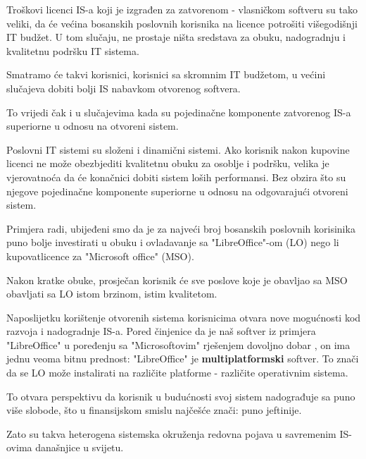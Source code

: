 \documentclass[times, utf8, seminar]{fit}
\begin{document}
Troškovi licenci IS-a koji je izgrađen za zatvorenom - vlasničkom softveru  su tako veliki, da će većina bosanskih poslovnih korisnika na licence potrošiti višegodišnji IT budžet. U tom slučaju, ne prostaje ništa sredstava za obuku, nadogradnju i kvalitetnu podršku IT sistema.

Smatramo će takvi korisnici, korisnici sa skromnim IT budžetom, u većini slučajeva dobiti bolji IS nabavkom otvorenog softvera.

To vrijedi čak i u slučajevima kada su pojedinačne komponente zatvorenog IS-a superiorne u odnosu na otvoreni sistem.

Poslovni IT sistemi su složeni i dinamični sistemi. Ako korisnik nakon kupovine licenci ne može obezbjediti kvalitetnu obuku za osoblje i podršku, velika je vjerovatnoća da će konačnici dobiti sistem loših performansi. Bez obzira što su njegove pojedinačne komponente superiorne u odnosu na odgovarajući otvoreni sistem.

Primjera radi, ubijeđeni smo da je za najveći broj bosanskih poslovnih korisinika puno bolje investirati u obuku i ovladavanje sa "LibreOffice"-om (LO) nego li kupovatlicence za "Microsoft office" (MSO). 

Nakon kratke obuke, prosječan korisnik će sve poslove koje je obavljao sa MSO obavljati sa LO istom brzinom, istim kvalitetom.

Naposlijetku korištenje otvorenih sistema korisnicima otvara nove mogućnosti kod razvoja i nadogradnje IS-a. 
Pored činjenice da je naš softver iz primjera "LibreOffice" u poređenju sa "Microsoftovim" rješenjem dovoljno dobar , on ima jednu veoma bitnu prednost: "LibreOffice" je \textbf{multiplatformski} softver. To znači da se LO može instalirati na različite platforme - različite operativnim sistema.

To otvara perspektivu da korisnik u budućnosti svoj sistem nadograđuje sa puno više slobode, što u finansijskom smislu najčešće znači: puno jeftinije.  

Zato su takva heterogena sistemska okruženja redovna pojava u savremenim IS-ovima današnjice u svijetu.  




\appendix
\end{document}

